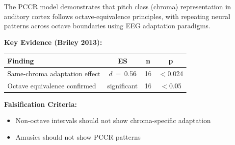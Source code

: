 \documentclass[9pt,onecolumn]{article}
\newcommand{\cohend}[1]{\textit{d}~=~#1}
\begin{document}
The PCCR model demonstrates that pitch class (chroma) representation in auditory cortex follows octave-equivalence principles, with repeating neural patterns across octave boundaries using EEG adaptation paradigms.

\textbf{Key Evidence (Briley 2013):}
\begin{center}
\small
\begin{tabular}{@{}lccc@{}}
\toprule
\textbf{Finding} & \textbf{ES} & \textbf{n} & \textbf{p} \\
\midrule
Same-chroma adaptation effect & \cohend{0.56} & 16 & $<$0.024 \\
Octave equivalence confirmed & significant & 16 & $<$0.05 \\
\bottomrule
\end{tabular}
\end{center}

\textbf{Falsification Criteria:}
\begin{itemize}[leftmargin=*, topsep=0pt, itemsep=0pt]
\item Non-octave intervals should not show chroma-specific adaptation
\item Amusics should not show PCCR patterns
\end{itemize}
\end{document}
